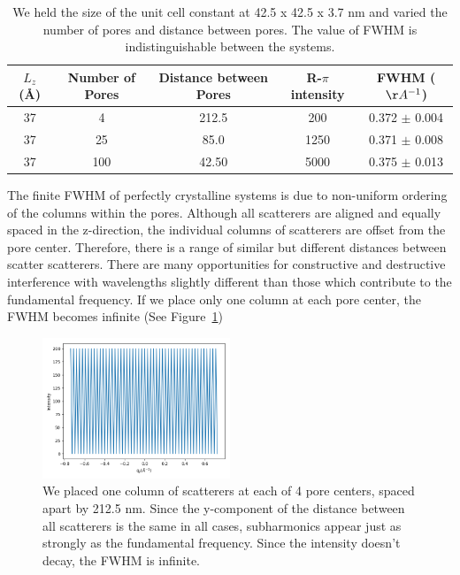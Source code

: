 \documentclass{article}
\begin{document}
  \begin{table}[!htb]
  \centering
  \begin{tabular}{c c c c c}
  \toprule
  $L_z$ (\AA) & Number of Pores & Distance between Pores &  R-$\pi$ intensity & FWHM ($\AA^{-1}$) \\
  \midrule
  37          &      4            & 212.5                & 200                & 0.372 $\pm$ 0.004 \\ 
  37          &      25           & 85.0                 & 1250               & 0.371 $\pm$ 0.008 \\
  37          &      100          & 42.50                & 5000               & 0.375 $\pm$ 0.013 \\
  \bottomrule
  \end{tabular}
  \caption{We held the size of the unit cell constant at 42.5 x 42.5 x 3.7 nm and varied the
   number of pores and distance between pores. The value of FWHM is indistinguishable between
   the systems.}\label{table:randomly_displaced_columns}
  \end{table}

  The finite FWHM of perfectly crystalline systems is due to non-uniform
  ordering of the columns within the pores. Although all scatterers are aligned
  and equally spaced in the z-direction, the individual columns of scatterers are
  offset from the pore center. Therefore, there is a range of similar but
  different distances between scatter scatterers. There are many opportunities
  for constructive and destructive interference with wavelengths slightly
  different than those which contribute to the fundamental frequency. If we place
  only one column at each pore center, the FWHM becomes infinite (See
  Figure~\ref{fig:infinite_FWHM})

  \begin{figure}[!htb]
  \centering
  \includegraphics[width=0.5\textwidth]{one_column_per_pore.png}
  \caption{We placed one column of scatterers at each of 4 pore centers, spaced apart by
  212.5 nm. Since the y-component of the distance between all scatterers is the same in 
  all cases, subharmonics appear just as strongly as the fundamental frequency. Since the 
  intensity doesn't decay, the FWHM is infinite.}\label{fig:infinite_FWHM}
  \end{figure}
\end{document}
